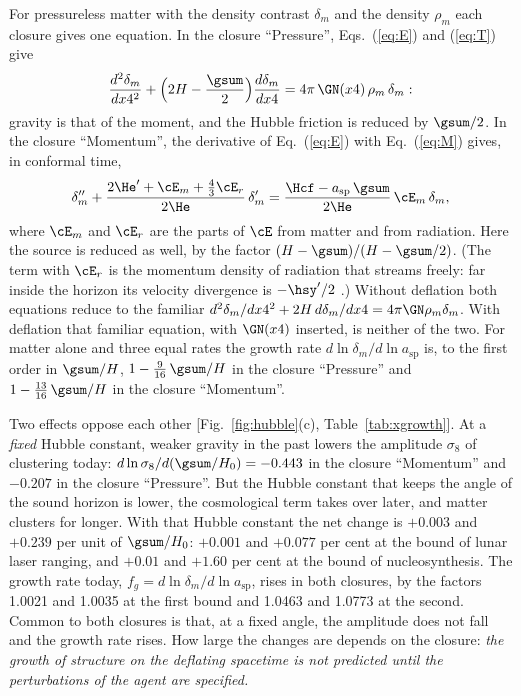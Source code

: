For pressureless matter with the density contrast $\delta_m$ and the density $\rho_m$ each closure
gives one equation. In the closure ``Pressure'', Eqs.~(\ref{eq:E}) and (\ref{eq:T}) give
\begin{equation}
\frac{d^{2}\delta_m}{dx4^{2}}+\Big(2H-\frac{\gsum}{2}\Big)\frac{d\delta_m}{dx4}=4\pi\,\GN(x4)\,\rho_m\,\delta_m :
\label{eq:growthP}
\end{equation}
gravity is that of the moment, and the Hubble friction is reduced by $\gsum/2$. In the closure
``Momentum'', the derivative of Eq.~(\ref{eq:E}) with Eq.~(\ref{eq:M}) gives, in conformal time,
\begin{equation}
\delta_m''+\frac{2\He'+\cE_m+\tfrac43\cE_r}{2\He}\,\delta_m'=\frac{\Hcf-a_{\mathrm{sp}}\,\gsum}{2\He}\,\cE_m\,\delta_m ,
\label{eq:growthM}
\end{equation}
where $\cE_m$ and $\cE_r$ are the parts of $\cE$ from matter and from radiation. Here the source is
reduced as well, by the factor $(H-\gsum)/(H-\gsum/2)$. (The term with $\cE_r$ is the momentum
density of radiation that streams freely: far inside the horizon its velocity divergence is
$-\hsy'/2$ \cite{MaBertschinger1995}.) Without deflation both equations reduce to the familiar
$d^{2}\delta_m/dx4^{2}+2H\,d\delta_m/dx4=4\pi\GN\rho_m\delta_m$. With deflation that familiar
equation, with $\GN(x4)$ inserted, is neither of the two. For matter alone and three equal rates the
growth rate $d\ln\delta_m/d\ln a_{\mathrm{sp}}$ is, to the first order in $\gsum/H$,
$1-\tfrac{9}{16}\,\gsum/H$ in the closure ``Pressure'' and $1-\tfrac{13}{16}\,\gsum/H$ in the closure
``Momentum''.

Two effects oppose each other [Fig.~\ref{fig:hubble}(c), Table~\ref{tab:xgrowth}]. At a \emph{fixed} Hubble constant, weaker
gravity in the past lowers the amplitude $\sigma_8$ of clustering today:
$d\ln\sigma_8/d(\gsum/H_0)=-0.443$ in the closure ``Momentum'' and $-0.207$ in the closure
``Pressure''. But the Hubble constant that keeps the angle of the sound horizon is lower, the
cosmological term takes over later, and matter clusters for longer. With that Hubble constant the net
change is $+0.003$ and $+0.239$ per unit of $\gsum/H_0$: $+0.001$ and $+0.077$ per cent at the bound
of lunar laser ranging, and $+0.01$ and $+1.60$ per cent at the bound of nucleosynthesis. The growth
rate today, $f_g=d\ln\delta_m/d\ln a_{\mathrm{sp}}$, rises in both closures, by the factors 1.0021
and 1.0035 at the first bound and 1.0463 and 1.0773 at the second. Common to both closures is that,
at a fixed angle, the amplitude does not fall and the growth rate rises. How large the changes are
depends on the closure: \emph{the growth of structure on the deflating spacetime is not predicted
until the perturbations of the agent are specified.}

